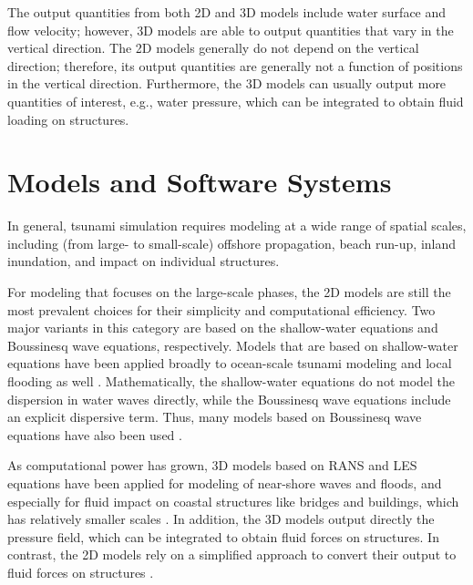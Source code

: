 The output quantities from both 2D and 3D models include water surface and flow velocity; however, 3D models are able to output quantities that vary in the vertical direction. The 2D models generally do not depend on the vertical direction; therefore, its output quantities are generally not a function of positions in the vertical direction. Furthermore, the 3D models can usually output more quantities of interest, e.g., water pressure, which can be integrated to obtain fluid loading on structures.

\section{Models and Software Systems}
\label{sec:tsunami_tools}

In general, tsunami simulation requires modeling at a wide range of spatial scales, including (from large- to small-scale) offshore propagation, beach run-up, inland inundation, and impact on individual structures.

For modeling that focuses on the large-scale phases, the 2D models are still the most prevalent choices for their simplicity and computational efficiency. Two major variants in this category are based on the shallow-water equations and Boussinesq wave equations, respectively. Models that are based on shallow-water equations have been applied broadly to ocean-scale tsunami modeling and local flooding as well \citep{berger2011geoclaw, george2004numerical, george2008augmented, hu2000numerical, hubbard20022d, popinet2012adaptive, qin2018comparison, wei2013dynamic} . Mathematically, the shallow-water equations do not model the dispersion in water waves directly, while the Boussinesq wave equations include an explicit dispersive term. Thus, many models based on Boussinesq wave equations have also been used \citep{kim2009depthintegrated, kim2017boussinesq, lynett2010application, madsen2003boussinesqtype, madsen1992new, shi2012highorder}. 

As computational power has grown, 3D models based on RANS and LES equations have been applied for modeling of near-shore waves and floods, and especially for fluid impact on coastal structures like bridges and buildings, which has relatively smaller scales \citep{biscarini2010computational, choi2007threedimensional, larsen2017tsunamiinduced, mayer2000simulation, montagna20113d, williams2016numerical}. In addition, the 3D models output directly the pressure field, which can be integrated to obtain fluid forces on structures. In contrast, the 2D models rely on a simplified approach to convert their output to fluid forces on structures \citep{motley2016, qin2016threedimensional, qin2018comparison, sarfaraz2017sph}. 

